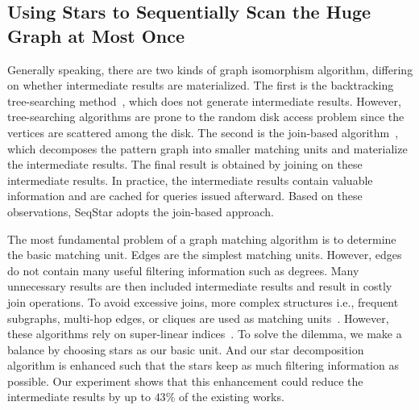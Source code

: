 \subsection{Using Stars to Sequentially Scan the Huge Graph at Most Once}\label{sec:match_star}
Generally speaking, there are two kinds of graph isomorphism algorithm,
differing on whether intermediate results are materialized.
The first is the backtracking tree-searching method~\cite{DBLP:journals/jacm/Ullmann76,DBLP:journals/pvldb/LeeHKL12,DBLP:conf/sigmod/HanLL13,DBLP:conf/sigmod/KimLBHLKJ16},
which does not generate intermediate results.
However, tree-searching algorithms are prone to the random disk access problem since the vertices are scattered among the disk.
The second is the join-based algorithm~\cite{DBLP:journals/pvldb/LaiQLC15,DBLP:journals/pvldb/QiaoZC17,DBLP:journals/pvldb/SunWWSL12,DBLP:journals/pvldb/MhedhbiS19},
which decomposes the pattern graph into smaller matching units and materialize the intermediate results.
The final result is obtained by joining on these intermediate results.
In practice, the intermediate results contain valuable information and are cached for queries issued afterward.
Based on these observations, SeqStar adopts the join-based approach.

The most fundamental problem of a graph matching algorithm is to determine the basic matching unit.
Edges are the simplest matching units.
However, edges do not contain many useful filtering information such as degrees.
Many unnecessary results are then included intermediate results and result in costly join operations.
To avoid excessive joins, more complex structures i.e.,
frequent subgraphs, multi-hop edges, or cliques are used as matching units~\cite{DBLP:conf/sigmod/HeS08,DBLP:conf/edbt/ZhangLY09,DBLP:journals/pvldb/QiaoZC17}.
However, these algorithms rely on super-linear indices~\cite{DBLP:journals/pvldb/SunWWSL12}.
To solve the dilemma, we make a balance by choosing stars as our basic unit.
And our star decomposition algorithm is enhanced such that the stars keep as much filtering information as possible.
Our experiment shows that this enhancement could reduce the intermediate results by up to $43\%$ of the existing works.

